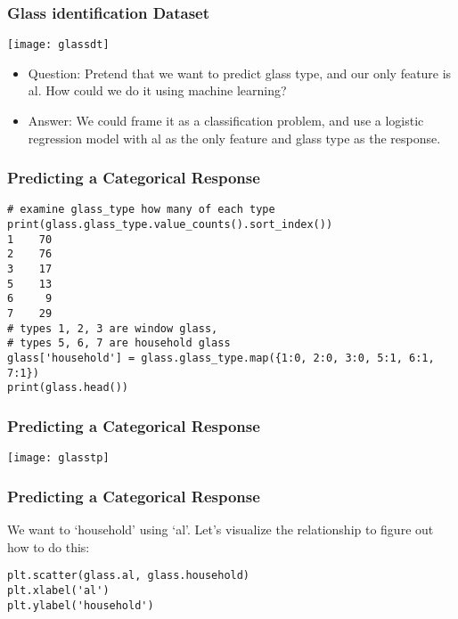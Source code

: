 \begin{frame}[fragile]\frametitle{Glass identification Dataset}
\begin{center}
\texttt{[image: glassdt]}
\end{center}
\begin{itemize}
\item Question: Pretend that we want to predict glass type, and our only feature is al. How could we do it using machine learning?
\item Answer: We could frame it as a classification problem, and use a logistic regression model with al as the only feature and glass type as the response.
\end{itemize}
\end{frame}


\begin{frame}[fragile]\frametitle{Predicting a Categorical Response}
\begin{lstlisting}
# examine glass_type how many of each type
print(glass.glass_type.value_counts().sort_index())
1    70
2    76
3    17
5    13
6     9
7    29
# types 1, 2, 3 are window glass,
# types 5, 6, 7 are household glass
glass['household'] = glass.glass_type.map({1:0, 2:0, 3:0, 5:1, 6:1, 7:1})
print(glass.head())
\end{lstlisting}
\end{frame}

\begin{frame}[fragile]\frametitle{Predicting a Categorical Response}
\begin{center}
\texttt{[image: glasstp]}
\end{center}
\end{frame}

\begin{frame}[fragile]\frametitle{Predicting a Categorical Response}
We want to `household' using `al'. Let's visualize the relationship to figure out how to do this:
\begin{lstlisting}
plt.scatter(glass.al, glass.household)
plt.xlabel('al')
plt.ylabel('household')
\end{lstlisting}
\end{frame}

